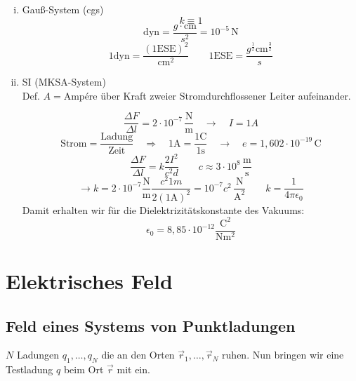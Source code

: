 \documentclass[titlepage,11pt,a4paper,ngerman]{report}
\newcommand{\tx}[1]{\textrm{#1}}
\begin{document}
\begin{enumerate}[i)]
	\item Gauß-System (cgs)
	\begin{equation*}
	k \equiv 1
	\end{equation*}
	\begin{equation*}
	\tx{dyn} = \frac{g \cdot \tx{cm}}{s^2} = 10^{-5} \, \tx{N}
	\end{equation*}
	\begin{equation*}
	1 \tx{dyn} = \frac{(1 \tx{ESE})^2}{\tx{cm}^2} \qquad 1 \tx{ESE} = \frac{g^{\frac{1}{2}} \tx{cm}^{\frac{3}{2}}}{s}
	\end{equation*}
	\item SI (MKSA-System)\\
	Def. $ A = \tx{Ampére} $ über Kraft zweier Stromdurchflossener Leiter aufeinander.


	\begin{equation*}
	\frac{\Delta F}{\Delta l} = 2 \cdot 10^{-7} \, \frac{\tx{N}}{\tx{m}} \quad \rightarrow \quad I = 1A
	\end{equation*}
	\begin{equation*}
	\tx{Strom} = \frac{\tx{Ladung}}{\tx{Zeit}} \quad \Rightarrow \quad 1 \tx{A} = \frac{1 \tx{C}}{1 \tx{s}} \quad \rightarrow \quad e = 1{,}602 \cdot 10^{-19} \, \tx{C}
	\end{equation*}
	\begin{equation*}
	\frac{\Delta F}{\Delta l} = k \frac{2 I^2}{c^2 d}\qquad c \approx 3 \cdot 10^{8} \, \frac{\tx{m}}{\tx{s}}
	\end{equation*}
	\begin{equation*}
	\rightarrow k = 2 \cdot 10^{-7} \frac{\tx{N}}{\tx{m}} \frac{c^2 1 m}{2 (1 \tx{A})^2} = 10^{-7} c^2 \, \frac{\tx{N}}{\tx{A}^2} \qquad k = \frac{1}{4 \pi \epsilon_0}
	\end{equation*}
	Damit erhalten wir für die Dielektrizitätskonstante des Vakuums:
	\begin{equation*}
	\epsilon_0 = 8{,}85 \cdot 10^{-12} \frac{\tx{C}^2}{\tx{N} \tx{m}^2}
	\end{equation*}
\end{enumerate}

\section{Elektrisches Feld}
\subsection{Feld eines Systems von Punktladungen}
$ N $ Ladungen $ q_1, \dots, q_N $ die an den Orten $ \vec{r}_1,\dots,\vec{r}_N $ ruhen. Nun bringen wir eine Testladung $ q $ beim Ort $ \vec{r} $ mit ein.
\end{document}
